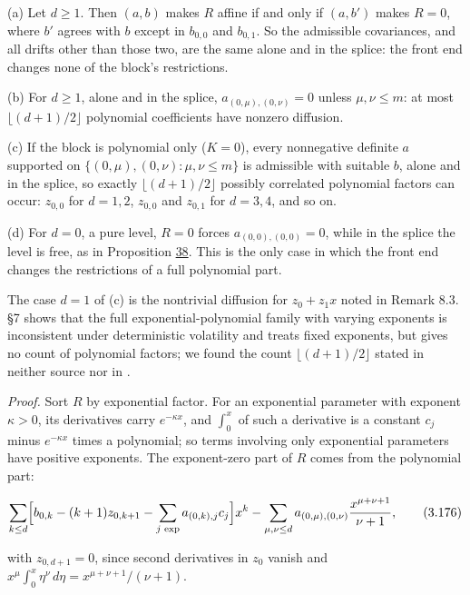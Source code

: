 \documentclass[11pt]{article}
\begin{document}
(a) Let \(d\ge1\). Then \((a,b)\) makes \(R\) affine if and only if \((a,b')\) makes \(R=0\), where \(b'\) agrees with \(b\) except in \(b_{0,0}\) and \(b_{0,1}\). So the admissible covariances, and all drifts other than those two, are the same alone and in the splice: the front end changes none of the block's restrictions.

(b) For \(d\ge1\), alone and in the splice, \(a_{(0,\mu),(0,\nu)}=0\) unless \(\mu,\nu\le m\): at most \(\lfloor(d+1)/2\rfloor\) polynomial coefficients have nonzero diffusion.

(c) If the block is polynomial only (\(K=0\)), every nonnegative definite \(a\) supported on \(\{(0,\mu),(0,\nu):\mu,\nu\le m\}\) is admissible with suitable \(b\), alone and in the splice, so exactly \(\lfloor(d+1)/2\rfloor\) possibly correlated polynomial factors can occur: \(z_{0,0}\) for \(d=1,2\), \(z_{0,0}\) and \(z_{0,1}\) for \(d=3,4\), and so on.

(d) For \(d=0\), a pure level, \(R=0\) forces \(a_{(0,0),(0,0)}=0\), while in the splice the level is free, as in Proposition \hyperref[res:Proposition-38]{38}. This is the only case in which the front end changes the restrictions of a full polynomial part.

The case \(d=1\) of (c) is the nontrivial diffusion for \(z_0+z_1x\) noted in \cite{filipovic2000exponential} Remark 8.3. \cite{bjork1999interest} §7 shows that the full exponential-polynomial family with varying exponents is inconsistent under deterministic volatility and treats fixed exponents, but gives no count of polynomial factors; we found the count \(\lfloor(d+1)/2\rfloor\) stated in neither source nor in \cite{filipovic2001consistency}.

\emph{Proof.} Sort \(R\) by exponential factor. For an exponential parameter with exponent \(\kappa>0\), its derivatives carry \(e^{-\kappa x}\), and \(\int_0^x\) of such a derivative is a constant \(c_j\) minus \(e^{-\kappa x}\) times a polynomial; so terms involving only exponential parameters have positive exponents. The exponent-zero part of \(R\) comes from the polynomial part:

\begin{equation*}
\sum_{k\le d}\Bigl[b_{0,k}-(k+1)z_{0,k+1}-\sum_{j\text{ exp}}a_{(0,k),j}c_j\Bigr]x^k-\sum_{\mu,\nu\le d}a_{(0,\mu),(0,\nu)}\frac{x^{\mu+\nu+1}}{\nu+1}, \tag{3.176}\label{eq:3.176}
\end{equation*}

with \(z_{0,d+1}=0\), since second derivatives in \(z_0\) vanish and \(x^\mu\int_0^x\eta^\nu\,d\eta=x^{\mu+\nu+1}/(\nu+1)\).
\end{document}
